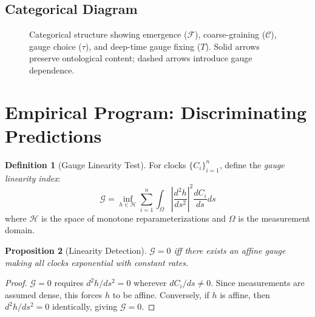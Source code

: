 \documentclass[11pt]{article}
\theoremstyle{definition}
\newtheorem{definition}{Definition}[section]
\theoremstyle{plain}
\newtheorem{proposition}[definition]{Proposition}
\theoremstyle{remark}
\newcommand{\Ecat}{\mathbf{E}}      %
\newcommand{\ST}{\mathbf{ST}}       %
\newcommand{\F}{\mathcal{F}}        %
\newcommand{\C}{\mathcal{C}}        %
\begin{document}
\subsection{Categorical Diagram}
\begin{figure}[h!]
\centering
{}
\caption{Categorical structure showing emergence ($\F$), coarse-graining ($\C$), gauge choice ($\tau$), and deep-time gauge fixing ($T$). Solid arrows preserve ontological content; dashed arrows introduce gauge dependence.}
\end{figure}

\section{Empirical Program: Discriminating Predictions}

\begin{definition}[Gauge Linearity Test]
For clocks $\{C_i\}_{i=1}^n$, define the \emph{gauge linearity index}:
$$\mathcal{G} = \inf_{h \in \mathcal{H}} \sum_{i=1}^n \int_\Omega \left| \frac{d^2 h}{ds^2} \right|^2 \frac{dC_i}{ds} ds$$
where $\mathcal{H}$ is the space of monotone reparameterizations and $\Omega$ is the measurement domain.
\end{definition}

\begin{proposition}[Linearity Detection]
$\mathcal{G} = 0$ iff there exists an affine gauge making all clocks exponential with constant rates.
\end{proposition}

\begin{proof}
$\mathcal{G} = 0$ requires $d^2h/ds^2 = 0$ wherever $dC_i/ds \neq 0$. Since measurements are assumed dense, this forces $h$ to be affine. Conversely, if $h$ is affine, then $d^2h/ds^2 = 0$ identically, giving $\mathcal{G} = 0$.
\end{proof}
\end{document}
